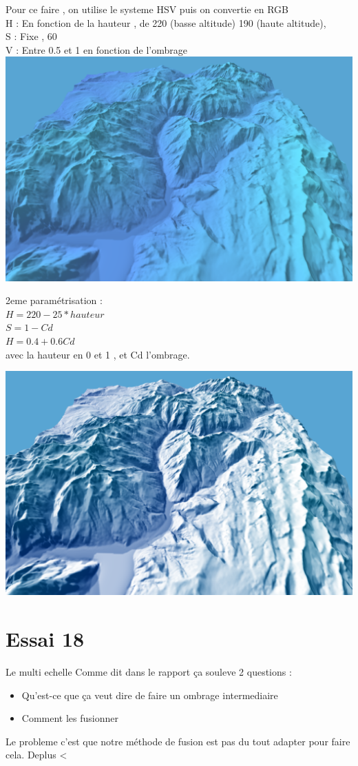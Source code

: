 \documentclass[a4paper]{article}
\begin{document}
Pour ce faire , on utilise le systeme HSV puis on convertie en RGB \\
H : En fonction de la hauteur , de 220 (basse altitude) 190 (haute altitude), \\
S : Fixe , 60 \\
V : Entre 0.5 et 1 en fonction de l'ombrage \\


\includegraphics[width=1.0\textwidth]{Images/Essais/Essai_17.png}

2eme paramétrisation : \\
$H = 220 - 25*hauteur$ \\
$S = 1 - Cd$ \\
$H = 0.4 + 0.6Cd$ \\
avec la hauteur en 0 et 1 , et Cd l'ombrage.

\includegraphics[width=1.0\textwidth]{Images/Essais/Essai_17_2.png}




\section{Essai 18}
Le multi echelle
Comme dit dans le rapport ça souleve 2 questions :
\begin{itemize}
\item Qu'est-ce que ça veut dire de faire un ombrage intermediaire
\item Comment les fusionner
\end{itemize}


Le probleme c'est que notre méthode de fusion est pas du tout adapter pour faire cela. Deplus <
\end{document}
